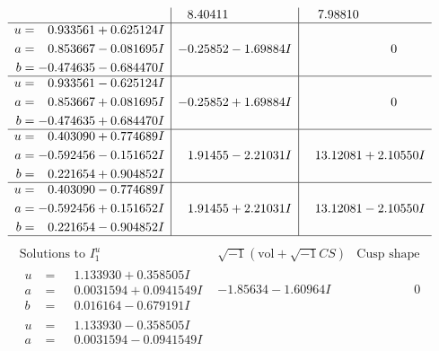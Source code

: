 \documentclass[1p]{elsarticle_modified}
\theoremstyle{definition}
\newcommand{\I}{\sqrt{-1}}
\begin{document}
$$\begin{array}{c|c|c}
 & \phantom{-}8.40411\phantom{ +0.000000I} & \phantom{-}7.98810\phantom{ +0.000000I} \\ \hline\begin{aligned}
u &= \phantom{-}0.933561 + 0.625124 I \\
a &= \phantom{-}0.853667 - 0.081695 I \\
b &= -0.474635 - 0.684470 I\end{aligned}
 & -0.25852 - 1.69884 I & \phantom{-0.000000 } 0 \\ \hline\begin{aligned}
u &= \phantom{-}0.933561 - 0.625124 I \\
a &= \phantom{-}0.853667 + 0.081695 I \\
b &= -0.474635 + 0.684470 I\end{aligned}
 & -0.25852 + 1.69884 I & \phantom{-0.000000 } 0 \\ \hline\begin{aligned}
u &= \phantom{-}0.403090 + 0.774689 I \\
a &= -0.592456 - 0.151652 I \\
b &= \phantom{-}0.221654 + 0.904852 I\end{aligned}
 & \phantom{-}1.91455 - 2.21031 I & \phantom{-}13.12081 + 2.10550 I \\ \hline\begin{aligned}
u &= \phantom{-}0.403090 - 0.774689 I \\
a &= -0.592456 + 0.151652 I \\
b &= \phantom{-}0.221654 - 0.904852 I\end{aligned}
 & \phantom{-}1.91455 + 2.21031 I & \phantom{-}13.12081 - 2.10550 I\\
 \hline 
 \end{array}$$\newpage$$\begin{array}{c|c|c}  
\text{Solutions to }I^u_{1}& \I (\text{vol} + \sqrt{-1}CS) & \text{Cusp shape}\\
 \hline 
\begin{aligned}
u &= \phantom{-}1.133930 + 0.358505 I \\
a &= \phantom{-}0.0031594 + 0.0941549 I \\
b &= \phantom{-}0.016164 - 0.679191 I\end{aligned}
 & -1.85634 - 1.60964 I & \phantom{-0.000000 } 0 \\ \hline\begin{aligned}
u &= \phantom{-}1.133930 - 0.358505 I \\
a &= \phantom{-}0.0031594 - 0.0941549 I \\

\end{aligned}
\end{array}$$
\end{document}
